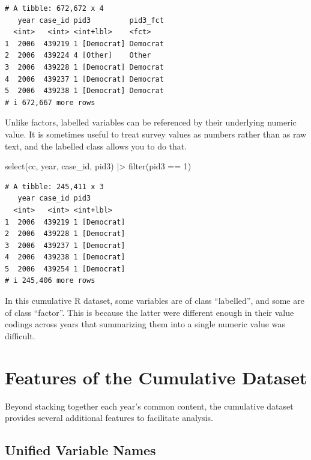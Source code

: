 \documentclass[10pt,article,oneside]{memoir}
\theoremstyle{definition}
\newenvironment{Shaded}{\begin{snugshade}}{\end{snugshade}}
\newcommand{\DecValTok}[1]{\textcolor[rgb]{0.68,0.00,0.00}{#1}}
\newcommand{\FunctionTok}[1]{\textcolor[rgb]{0.28,0.35,0.67}{#1}}
\newcommand{\NormalTok}[1]{\textcolor[rgb]{0.00,0.23,0.31}{#1}}
\newcommand{\SpecialCharTok}[1]{\textcolor[rgb]{0.37,0.37,0.37}{#1}}
\begin{document}
\begin{verbatim}
# A tibble: 672,672 x 4
   year case_id pid3         pid3_fct
  <int>   <int> <int+lbl>    <fct>   
1  2006  439219 1 [Democrat] Democrat
2  2006  439224 4 [Other]    Other   
3  2006  439228 1 [Democrat] Democrat
4  2006  439237 1 [Democrat] Democrat
5  2006  439238 1 [Democrat] Democrat
# i 672,667 more rows
\end{verbatim}

\noindent Unlike factors, labelled variables can be referenced by their
underlying numeric value. It is sometimes useful to treat survey values
as numbers rather than as raw text, and the labelled class allows you to
do that.

\begin{Shaded}
\begin{Highlighting}[]
\FunctionTok{select}\NormalTok{(cc, year, case\_id, pid3) }\SpecialCharTok{|\textgreater{}} 
  \FunctionTok{filter}\NormalTok{(pid3 }\SpecialCharTok{==} \DecValTok{1}\NormalTok{)}
\end{Highlighting}
\end{Shaded}

\begin{verbatim}
# A tibble: 245,411 x 3
   year case_id pid3        
  <int>   <int> <int+lbl>   
1  2006  439219 1 [Democrat]
2  2006  439228 1 [Democrat]
3  2006  439237 1 [Democrat]
4  2006  439238 1 [Democrat]
5  2006  439254 1 [Democrat]
# i 245,406 more rows
\end{verbatim}

\indent In this cumulative R dataset, some variables are of class
``labelled'', and some are of class ``factor''. This is because the
latter were different enough in their value codings across years that
summarizing them into a single numeric value was difficult.

\newpage

\section{Features of the Cumulative
Dataset}\label{features-of-the-cumulative-dataset}

Beyond stacking together each year's common content, the cumulative
dataset provides several additional features to facilitate analysis.

\subsection{Unified Variable Names}\label{unified-variable-names}
\end{document}
